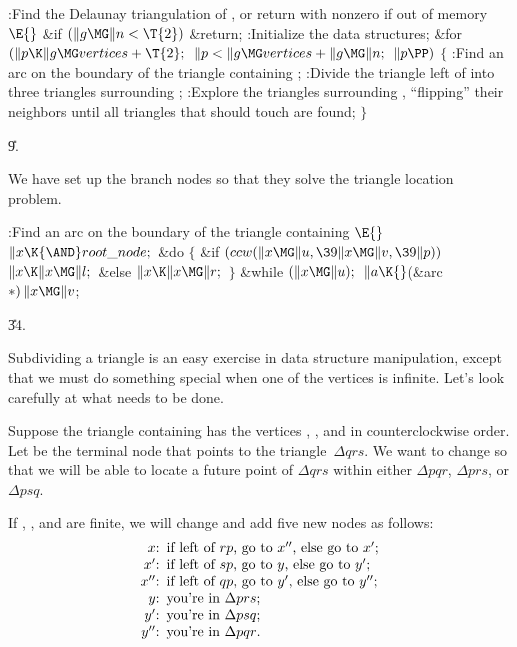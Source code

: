 \Y\B\4:Find the Delaunay triangulation of , or return with  nonzero if out of memory\X${}\E{}$\6
\&{if} ${}(\|g\MG\|n<\T{2}){}$\1\5
\&{return};\2\6
:Initialize the data structures\X;\6
\&{for} ${}(\|p\K\|g\MG\\{vertices}+\T{2};{}$ ${}\|p<\|g\MG\\{vertices}+\|g\MG%
\|n;{}$ ${}\|p\PP){}$\5
${}\{{}$\1\6
:Find an arc  on the boundary of the triangle containing %
\X;\6
:Divide the triangle left of  into three triangles surrounding \X;\6
:Explore the triangles surrounding , ``flipping'' their neighbors
until all triangles that should touch  are found\X;\6
\4${}\}{}$\2\par
\U9.\fi

We have set up the branch nodes so that they solve the triangle location
problem.

\Y\B\4:Find an arc  on the boundary of the triangle containing \X${}\E{}$\6
$\|x\K{\AND}\\{root\_node};{}$\6
\&{do}\5
${}\{{}$\1\6
\&{if} ${}(\\{ccw}(\|x\MG\|u,\39\|x\MG\|v,\39\|p)){}$\1\5
${}\|x\K\|x\MG\|l;{}$\2\6
\&{else}\1\5
${}\|x\K\|x\MG\|r;{}$\2\6
\4${}\}{}$\5
\2\5
\&{while} ${}(\|x\MG\|u);{}$\6
${}\|a\K{}$(\&{arc} ${}{*})\,\|x\MG\|v{}$;\par
\U34.\fi

Subdividing a triangle is an easy exercise in data structure
manipulation,
except that we must do something special when one of the vertices is
infinite. Let's look carefully at what needs to be done.

Suppose the triangle containing  has the vertices , ,
and 
in counterclockwise order. Let  be the terminal node that points to
the triangle~$\Delta qrs$. We want to change  so that we will be
able to locate a future point of $\Delta qrs$ within either $\Delta pqr$,
$\Delta prs$, or $\Delta psq$.

If , , and  are finite, we will change  and add
five new nodes
as follows:
$$\vbox{\halign{\hfil#:\enspace&#\hfil\cr
$x$&if left of $rp$, go to $x''$, else go to $x'$;\cr
$x'$&if left of $sp$, go to $y$, else go to $y'$;\cr
$x''$&if left of $qp$, go to $y'$, else go to $y''$;\cr
$y$&you're in $\Delta prs$;\cr
$y'$&you're in $\Delta psq$;\cr
$y''$&you're in $\Delta pqr$.\cr}}$$

